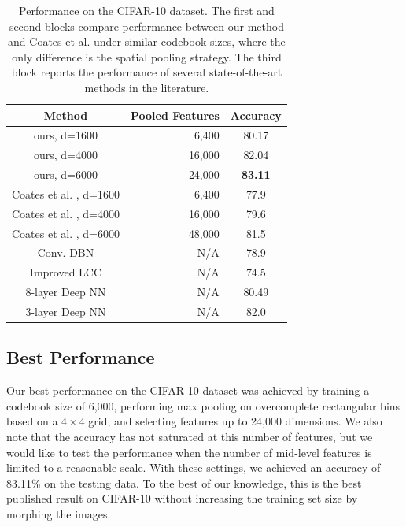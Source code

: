 \begin{table}
  \begin{minipage}[c]{1\linewidth}
  \begin{center}
  \begin{tabular}{c|r|c}
    \hline
    Method & Pooled Features & Accuracy \\
    \hline
    ours, d=1600 & 6,400 & 80.17 \\
    ours, d=4000 & 16,000 & 82.04 \\
    ours, d=6000 & 24,000 & {\bfseries 83.11}\\
    \hline
    Coates et al. \cite{Coates:wo}, d=1600 & 6,400 & 77.9\phantom{0} \\
    Coates et al. \cite{Coates:wo}, d=4000 & 16,000 & 79.6\phantom{0} \\
    Coates et al. \cite{Coates:2011ud}, d=6000 & 48,000 & 81.5\phantom{0}\\
    \hline
    Conv. DBN \cite{Krizhevsky2010} & N/A & 78.9\phantom{0} \\
    Improved LCC \cite{Yu:2010wu} & N/A & 74.5\phantom{0} \\
    8-layer Deep NN \cite{2011arXiv1102.0183C} & N/A & 80.49 \\
    3-layer Deep NN \cite{coates2011selecting} & N/A & 82.0\phantom{0} \\
    \hline
  \end{tabular}
  \end{center}
  \end{minipage}
  \caption{Performance on the CIFAR-10 dataset. The first and second blocks compare performance between our method and Coates et al. \cite{Coates:wo,Coates:2011ud} under similar codebook sizes, where the only difference is the spatial pooling strategy. The third block reports the performance of several state-of-the-art methods in the literature.}\label{table:cifar10}
\end{table}

\subsection{Best Performance}
Our best performance on the CIFAR-10 dataset was achieved by training a codebook size of 6,000, performing max pooling on overcomplete rectangular bins based on a $4\times4$ grid, and selecting features up to 24,000 dimensions. We also note that the accuracy has not saturated at this number of features, but we would like to test the performance when the number of mid-level features is limited to a reasonable scale. With these settings, we achieved an accuracy of 83.11\% on the testing data. To the best of our knowledge, this is the best published result on CIFAR-10 without increasing the training set size by morphing the images. 

